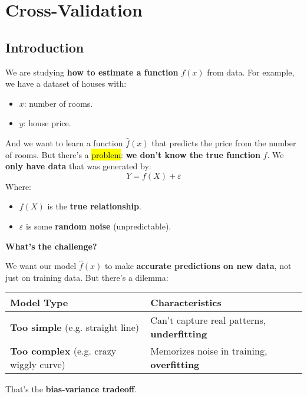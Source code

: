 \section{Cross-Validation}

\subsection{Introduction}

We are studying \textbf{how to estimate a function} $f(x)$ from data. For example, we have a dataset of houses with:
\begin{itemize}
    \item $x$: number of rooms.
    \item $y$: house price.
\end{itemize}
And we want to learn a function $\hat{f}(x)$ that predicts the price from the number of rooms. But there's a \hl{problem}: \textbf{we don't know the true function} $f$. We \textbf{only have data} that was generated by:
\begin{equation*}
    Y = f(X) + \varepsilon    
\end{equation*}
Where:
\begin{itemize}
    \item $f(X)$ is the \textbf{true relationship}.
    \item $\varepsilon$ is some \textbf{random noise} (unpredictable).
\end{itemize}

\highspace
\begin{flushleft}
    \textcolor{Green3}{ \textbf{What's the challenge?}}
\end{flushleft}
We want our model $\hat{f}(x)$ to make \textbf{accurate predictions on new data}, not just on training data. But there's a dilemma:
\begin{table}[!htp]
    \centering
    \begin{adjustbox}{width={\textwidth},totalheight={\textheight},keepaspectratio}
        \begin{tabular}{@{} l l @{}}
            \toprule
            Model Type & Characteristics \\
            \midrule
            \textbf{Too simple} (e.g. straight line)        & Can't capture real patterns, \textbf{underfitting} \\ [.3em]
            \textbf{Too complex} (e.g. crazy wiggly curve)  & Memorizes noise in training, \textbf{overfitting} \\
            \bottomrule
        \end{tabular}
    \end{adjustbox}
\end{table}
That's the \textbf{bias-variance tradeoff}.

